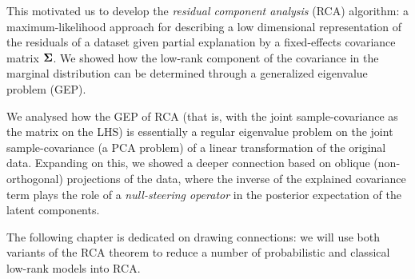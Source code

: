     This motivated us to
    develop the \textit{residual component analysis} (RCA) algorithm: a maximum-likelihood approach for describing a low dimensional representation of the residuals of a dataset given partial explanation by a fixed-effects covariance matrix $\mathbf{\Sigma}$.
    We showed how the low-rank component of the covariance in the marginal distribution can be determined through a generalized eigenvalue problem (GEP).

    We analysed how the GEP of RCA (that is, with the joint sample-covariance as the matrix on the LHS) is essentially a regular eigenvalue problem on the joint sample-covariance (a PCA problem) of a linear transformation of the original data.
    Expanding on this, we showed a deeper connection based on oblique (non-orthogonal) projections of the data, where the inverse of the explained covariance term plays the role of a \textit{null-steering operator} in the posterior expectation of the latent components.
    
    The following chapter is dedicated on drawing connections: we will use both variants of the RCA theorem to reduce a number of probabilistic and classical low-rank models into RCA.

    
    

